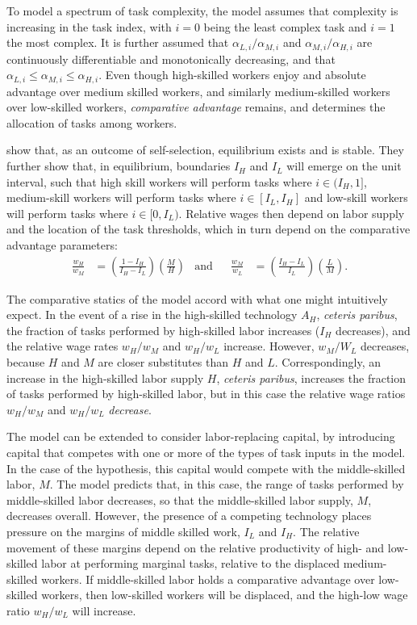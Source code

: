 To model a spectrum of task complexity, the model assumes that complexity is increasing in the task index, with $i=0$ being the least complex task and $i=1$ the most complex. It is further assumed that $\alpha_{L,i}/\alpha_{M,i}$ and  $\alpha_{M,i}/\alpha_{H,i}$ are
continuously differentiable and monotonically decreasing, and that ${\alpha_{L,i} \leq \alpha_{M,i} \leq \alpha_{H,i}.}$
Even though high-skilled workers enjoy and absolute advantage over medium skilled workers, and similarly medium-skilled workers over low-skilled workers, {\em comparative advantage} remains, and determines the allocation of tasks among workers.

\citet{Acemoglu2011} show that, as an outcome of self-selection, equilibrium exists and is stable. They further show that, in equilibrium, boundaries $I_H$ and $I_L$ will emerge on the unit interval, such that high skill workers will perform tasks where $i \in (I_H,1]$, medium-skill workers will perform tasks where $i \in [I_L, I_H]$ and low-skill workers will perform tasks where $i \in [0, I_L)$. Relative wages then depend on labor supply and the location of the task thresholds, which in turn depend on the comparative advantage parameters:
\begin{align*}
  \frac{w_H}{w_M} &= \left( \frac{1-I_H}{I_H - I_L} \right)\left(\frac{M}{H}\right) & \text{and} &&
  \frac{w_M}{w_L} &= \left( \frac{I_H-I_L}{I_L} \right)\left(\frac{L}{M}\right).
\end{align*}

The comparative statics of the model accord with what one might intuitively expect. In the event of a rise in the high-skilled technology $A_H$, {\em ceteris paribus}, the fraction of tasks performed by high-skilled labor increases ($I_H$ decreases), and the relative wage rates $w_H/w_M$ and $w_H/w_L$ increase. However, $w_M/W_L$ decreases, because $H$ and $M$ are closer substitutes than $H$ and $L$. Correspondingly, an increase in the high-skilled labor supply $H$, {\em ceteris paribus}, increases the fraction of tasks performed by high-skilled labor, but in this case the relative wage ratios $w_H/w_M$ and $w_H/w_L$ {\em decrease}.

The model can be extended to consider labor-replacing capital, by introducing capital that competes with one or more of the types of task inputs in the model. In the case of the \citet{Levy2003} hypothesis, this capital would compete with the middle-skilled labor, $M$. The model predicts that, in this case, the range of tasks performed by middle-skilled labor decreases, so that the middle-skilled labor supply, $M$, decreases overall. However, the presence of a competing technology places pressure on the margins of middle skilled work, $I_L$ and $I_H$. The relative movement of these margins depend on the relative productivity of high- and low-skilled labor at performing marginal tasks, relative to the displaced medium-skilled workers. If middle-skilled labor holds a comparative advantage over low-skilled workers, then low-skilled workers will be displaced, and the high-low wage ratio $w_H/w_L$ will increase.

